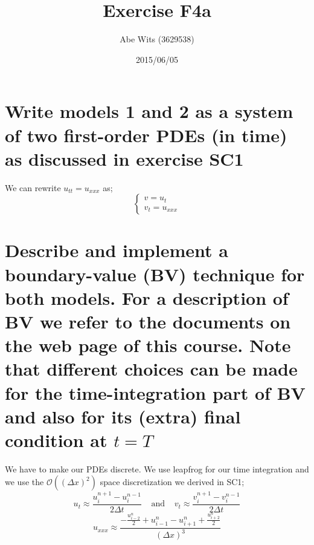 \documentclass{article}
\renewcommand{\(}{\left(}
\renewcommand{\)}{\right)}
\newcommand{\hot}[1]{\mathcal{O}\(#1\)}
\newcommand{\uinp}{u_i^{n+1}}
\newcommand{\uinm}{u_i^{n-1}}
\newcommand{\uipn}{u_{i+1}^n}
\newcommand{\uimn}{u_{i-1}^n}
\newcommand{\vinp}{v_i^{n+1}}
\newcommand{\vinm}{v_i^{n-1}}
\newcommand{\dt}{\Delta t}
\newcommand{\dx}{\Delta x}
\newcommand{\half}[1]{\frac{{#1}}{2}}
\begin{document}
\title{Exercise F4a}
\author{Abe Wits (3629538)}
\date{2015/06/05}

\maketitle

\setlength{\parskip}{0.2 cm}
\setlength{\parindent}{0.0 cm}

\section*{Write models 1 and 2 as a system of two first-order PDEs (in time) as discussed in exercise \textbf{SC1}}
We can rewrite $u_{tt} = u_{xxx}$ as;
$$
\begin{cases}
v = u_t\\
v_t = u_{xxx}
\end{cases}
$$

\section*{Describe and implement a boundary-value (BV) technique for both models. For a description of BV we refer to the documents on the web page of this course. Note that different choices can be made for the time-integration part of BV and also for its (extra) final condition at $t=T$}
We have to make our PDEs discrete. We use leapfrog for our time integration and we use the $\hot{(\dx)^2}$ space discretization we derived in SC1;
$$u_t \approx \frac{\uinp - \uinm}{2\dt} \;\;\;\;\mathrm{and}\;\;\;\;v_t \approx \frac{\vinp - \vinm}{2\dt}$$
$$u_{xxx} \approx \frac{-\half{u_{i-2}^n}+\uimn-\uipn+\half{u_{i+2}^n}}{(\dx)^3}$$
\end{document}
